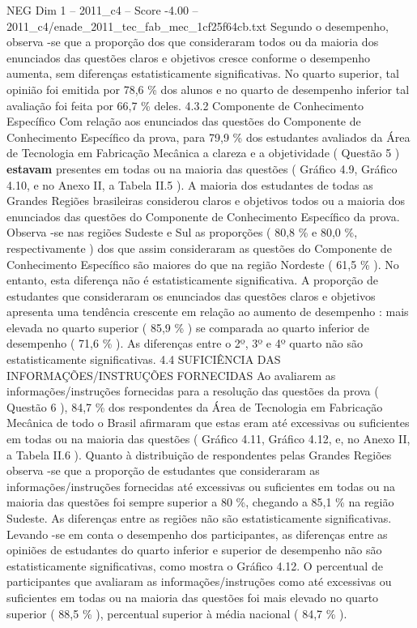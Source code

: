 \begin{textsample}{NEG Dim 1 – 2011\_c4 – Score -4.00 – 2011\_c4/enade\_2011\_tec\_fab\_mec\_1cf25f64cb.txt}
Segundo o desempenho, observa -se que a proporção dos que consideraram todos ou da maioria dos enunciados das questões claros e objetivos cresce conforme o desempenho aumenta, sem diferenças estatisticamente significativas.
No quarto superior, tal opinião foi emitida por 78,6 \% dos alunos e no quarto de desempenho inferior tal avaliação foi feita por 66,7 \% deles. 4.3.2 Componente de Conhecimento Específico Com relação aos enunciados das questões do Componente de Conhecimento Específico da prova, para 79,9 \% dos estudantes avaliados da Área de Tecnologia em Fabricação Mecânica a clareza e a objetividade ( Questão 5 ) \textbf{estavam} presentes em todas ou na maioria das questões ( Gráfico 4.9, Gráfico 4.10, e no Anexo II, a Tabela II.5 ).
A maioria dos estudantes de todas as Grandes Regiões brasileiras considerou claros e objetivos todos ou a maioria dos enunciados das questões do Componente de Conhecimento Específico da prova.
Observa -se nas regiões Sudeste e Sul as proporções ( 80,8 \% e 80,0 \%, respectivamente ) dos que assim consideraram as questões do Componente de Conhecimento Específico são maiores do que na região Nordeste ( 61,5 \% ).
No entanto, esta diferença não é estatisticamente significativa.
A proporção de estudantes que consideraram os enunciados das questões claros e objetivos apresenta uma tendência crescente em relação ao aumento de desempenho : mais elevada no quarto superior ( 85,9 \% ) se comparada ao quarto inferior de desempenho ( 71,6 \% ).
As diferenças entre o 2º, 3º e 4º quarto não são estatisticamente significativas. 4.4 SUFICIÊNCIA DAS INFORMAÇÕES/INSTRUÇÕES FORNECIDAS Ao avaliarem as informações/instruções fornecidas para a resolução das questões da prova ( Questão 6 ), 84,7 \% dos respondentes da Área de Tecnologia em Fabricação Mecânica de todo o Brasil afirmaram que estas eram até excessivas ou suficientes em todas ou na maioria das questões ( Gráfico 4.11, Gráfico 4.12, e, no Anexo II, a Tabela II.6 ).
Quanto à distribuição de respondentes pelas Grandes Regiões observa -se que a proporção de estudantes que consideraram as informações/instruções fornecidas até excessivas ou suficientes em todas ou na maioria das questões foi sempre superior a 80 \%, chegando a 85,1 \% na região Sudeste.
As diferenças entre as regiões não são estatisticamente significativas.
Levando -se em conta o desempenho dos participantes, as diferenças entre as opiniões de estudantes do quarto inferior e superior de desempenho não são estatisticamente significativas, como mostra o Gráfico 4.12.
O percentual de participantes que avaliaram as informações/instruções como até excessivas ou suficientes em todas ou na maioria das questões foi mais elevado no quarto superior ( 88,5 \% ), percentual superior à média nacional ( 84,7 \% ).

\end{textsample}
